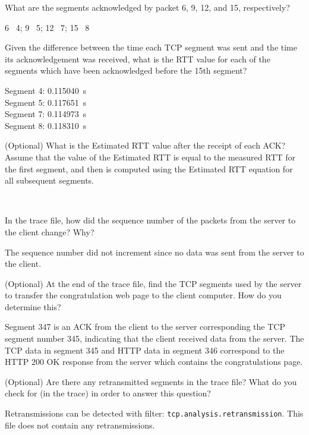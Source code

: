 \begin{Question}
	What are the segments acknowledged by packet 6, 9, 12, and 15, respectively?
\end{Question}
\begin{Answer}
	6 \ackarrow\ 4; 9 \ackarrow\ 5; 12 \ackarrow\ 7; 15 \ackarrow\ 8
\end{Answer}

\begin{Question}
	Given the difference between the time each TCP segment was sent and the time its acknowledgement was received, what is the RTT value for each of the segments which have been acknowledged before the 15th segment?
\end{Question}
\begin{Answer}
	Segment 4: \SI{0.115040}{\second}\\
	Segment 5: \SI{0.117651}{\second}\\
	Segment 7: \SI{0.114973}{\second}\\
	Segment 8: \SI{0.118310}{\second}
\end{Answer}

\begin{Question}
	(Optional) What is the Estimated RTT value after the receipt of each ACK? Assume that the value of the Estimated RTT is equal to the measured RTT for the first segment, and then is computed using the Estimated RTT equation for all subsequent segments.
\end{Question}
\begin{Answer}
	\textemdash\
\end{Answer}

\begin{Question}
	In the trace file, how did the sequence number of the packets from the server to the client change? Why?
\end{Question}
\begin{Answer}
	The sequence number did not increment since no data was sent from the server to the client.
\end{Answer}

\begin{Question}
	(Optional) At the end of the trace file, find the TCP segments used by the server to transfer the congratulation web page to the client computer. How do you determine this?
\end{Question}
\begin{Answer}
	Segment 347 is an ACK from the client to the server corresponding the TCP segment number 345, indicating that the client received data from the server.
	The TCP data in segment 345 and HTTP data in segment 346 correspond to the HTTP 200 OK response from the server which contains the congratulations page.
\end{Answer}

\begin{Question}
	(Optional) Are there any retransmitted segments in the trace file? What do you check for (in the trace) in order to answer this question?
\end{Question}
\begin{Answer}
	Retransmissions can be detected with filter: \texttt{tcp.analysis.retransmission}.
	This file does not contain any retransmissions.
\end{Answer}
